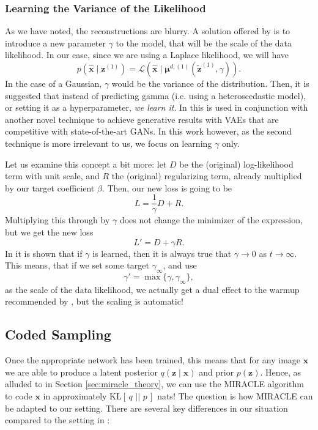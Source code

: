 \documentclass{article}
\renewcommand{\vec}[1]{\mathbf{#1}}
\newcommand{\KL}[2]{\mathrm{KL}[\,#1\,\,||\,\,#2\,]}
\newcommand{\Laplace}[1]{\mathcal{L}\left( #1 \right)}
\newcommand{\MU}{\boldsymbol\mu}
\begin{document}
\subsubsection{Learning the Variance of the Likelihood}
\label{sec:learn_gamma}
\par
As we have noted, the reconstructions are blurry.
A solution offered by \cite{dai2019diagnosing} is to introduce a new parameter
$\gamma$ to the model, that will be the scale of the data likelihood. In our
case, since we are using a Laplace likelihood, we will have
\[
  p(\vec{\hat{x}} \mid \vec{z}^{(1)}) = \Laplace{\vec{\hat{x}} \mid \MU^{d,
      (1)}(\vec{\tilde{z}}^{(1)}, \gamma)}.
\]
In the case of a Gaussian, $\gamma$ would be the variance of the distribution.
Then, it is suggested that instead of predicting gamma (i.e. using a
heteroscedastic model), or setting it as a hyperparameter, \textit{we learn it}.
In \cite{dai2019diagnosing} this is used in conjunction with another novel
technique to achieve generative results with VAEs that are competitive with
state-of-the-art GANs. In this work however, as the second technique is more
irrelevant to us, we focus on learning $\gamma$ only.
\par
Let us examine this concept a bit more: let $D$ be the (original) log-likelihood
term with unit scale, and $R$ the (original) regularizing term, already
multiplied by our target coefficient $\beta$. Then, our new loss is going to be
\[
  L = \frac{1}{\gamma}D + R.
\]
Multiplying this through by $\gamma$ does not change the minimizer of the
expression, but we get the new loss
\[
  L' = D + \gamma R.
\]
In \cite{dai2019diagnosing} it is shown that if $\gamma$ is learned, then it is
always true that $\gamma \rightarrow 0$ as $t \rightarrow \infty$. This means,
that if we set some target $\gamma_\infty$, and use
\[
  \gamma' = \max\{ \gamma, \gamma_\infty \},
\]
as the scale of the data likelihood, we actually get a dual effect to the warmup
recommended by \cite{sonderby2016train}, but the scaling is automatic!

\subsection{Coded Sampling}
\label{sec:coded_sampling}
\par
Once the appropriate network has been trained, this means that for any image $\vec{x}$
we are able to produce a latent posterior $q(\vec{z} \mid \vec{x})$ and prior
$p(\vec{z})$. Hence, as alluded to in Section \ref{sec:miracle_theory}, we can
use the MIRACLE algorithm to code $\vec{x}$ in approximately $\KL{q}{p}$ nats!
The question is how MIRACLE can be adapted to our setting. There are several key
differences in our situation compared to the setting in
\cite{havasi2018minimal}:
\end{document}
